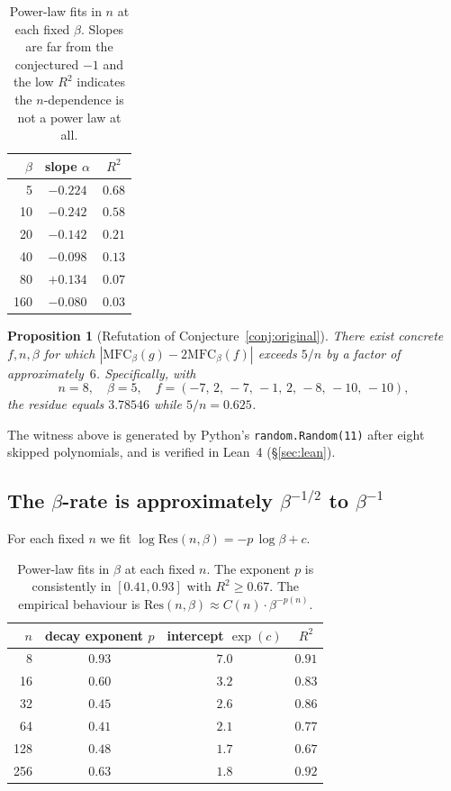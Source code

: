 \documentclass[11pt,a4paper]{article}
\newtheorem{proposition}{Proposition}
\begin{document}
\begin{table}[h]
\centering
\small
\begin{tabular}{r c c}
\toprule
$\beta$ & slope $\alpha$ & $R^2$ \\
\midrule
5   & $-0.224$ & $0.68$ \\
10  & $-0.242$ & $0.58$ \\
20  & $-0.142$ & $0.21$ \\
40  & $-0.098$ & $0.13$ \\
80  & $+0.134$ & $0.07$ \\
160 & $-0.080$ & $0.03$ \\
\bottomrule
\end{tabular}
\caption{Power-law fits in $n$ at each fixed $\beta$. Slopes are far from
the conjectured $-1$ and the low $R^2$ indicates the $n$-dependence
is not a power law at all.}
\label{tab:fit-n}
\end{table}

\begin{proposition}[Refutation of Conjecture~\ref{conj:original}]\label{prop:refutation}
There exist concrete $f, n, \beta$ for which
$|\mathrm{MFC}_\beta(g) - 2\mathrm{MFC}_\beta(f)|$ exceeds $5/n$ by a factor
of approximately~$6$. Specifically, with
\[
n=8, \quad \beta=5, \quad
f = (-7,\, 2,\, -7,\, -1,\, 2,\, -8,\, -10,\, -10),
\]
the residue equals $3.78546$ while $5/n = 0.625$.
\end{proposition}

The witness above is generated by Python's \texttt{random.Random(11)}
after eight skipped polynomials, and is verified in Lean~4 (\S\ref{sec:lean}).

\subsection{The $\beta$-rate is approximately $\beta^{-1/2}$ to $\beta^{-1}$}

For each fixed $n$ we fit $\log \mathrm{Res}(n,\beta) = -p\,\log\beta + c$.

\begin{table}[h]
\centering
\small
\begin{tabular}{r c c c}
\toprule
$n$ & decay exponent $p$ & intercept $\exp(c)$ & $R^2$ \\
\midrule
8   & $0.93$ & $7.0$ & $0.91$ \\
16  & $0.60$ & $3.2$ & $0.83$ \\
32  & $0.45$ & $2.6$ & $0.86$ \\
64  & $0.41$ & $2.1$ & $0.77$ \\
128 & $0.48$ & $1.7$ & $0.67$ \\
256 & $0.63$ & $1.8$ & $0.92$ \\
\bottomrule
\end{tabular}
\caption{Power-law fits in $\beta$ at each fixed $n$. The exponent
$p$ is consistently in $[0.41, 0.93]$ with $R^2 \geq 0.67$. The empirical
behaviour is $\mathrm{Res}(n,\beta) \approx C(n)\cdot \beta^{-p(n)}$.}
\label{tab:fit-beta}
\end{table}
\end{document}
